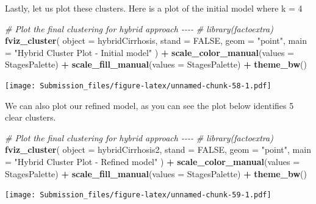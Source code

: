\documentclass[
]{article}
\newenvironment{Shaded}{\begin{snugshade}}{\end{snugshade}}
\newcommand{\AttributeTok}[1]{\textcolor[rgb]{0.13,0.29,0.53}{#1}}
\newcommand{\CommentTok}[1]{\textcolor[rgb]{0.56,0.35,0.01}{\textit{#1}}}
\newcommand{\ConstantTok}[1]{\textcolor[rgb]{0.56,0.35,0.01}{#1}}
\newcommand{\FunctionTok}[1]{\textcolor[rgb]{0.13,0.29,0.53}{\textbf{#1}}}
\newcommand{\NormalTok}[1]{#1}
\newcommand{\SpecialCharTok}[1]{\textcolor[rgb]{0.81,0.36,0.00}{\textbf{#1}}}
\newcommand{\StringTok}[1]{\textcolor[rgb]{0.31,0.60,0.02}{#1}}
\begin{document}
Lastly, let us plot these clusters. Here is a plot of the initial model
where k = 4

\begin{Shaded}
\begin{Highlighting}[]
\CommentTok{\# Plot the final clustering for hybrid approach {-}{-}{-}{-}}
\CommentTok{\# library(factoextra)}
\FunctionTok{fviz\_cluster}\NormalTok{(}
  \AttributeTok{object =}\NormalTok{ hybridCirrhosis,}
  \AttributeTok{stand =} \ConstantTok{FALSE}\NormalTok{,}
  \AttributeTok{geom =} \StringTok{"point"}\NormalTok{,}
  \AttributeTok{main =} \StringTok{"Hybrid Cluster Plot {-} Initial model"}
\NormalTok{) }\SpecialCharTok{+}
  \FunctionTok{scale\_color\_manual}\NormalTok{(}\AttributeTok{values =}\NormalTok{ StagesPalette) }\SpecialCharTok{+}
  \FunctionTok{scale\_fill\_manual}\NormalTok{(}\AttributeTok{values =}\NormalTok{ StagesPalette) }\SpecialCharTok{+}
  \FunctionTok{theme\_bw}\NormalTok{() }
\end{Highlighting}
\end{Shaded}

\texttt{[image: Submission\_files/figure-latex/unnamed-chunk-58-1.pdf]}

We can also plot our refined model, as you can see the plot below
identifies 5 clear clusters.

\begin{Shaded}
\begin{Highlighting}[]
\CommentTok{\# Plot the final clustering for hybrid approach {-}{-}{-}{-}}
\CommentTok{\# library(factoextra)}
\FunctionTok{fviz\_cluster}\NormalTok{(}
  \AttributeTok{object =}\NormalTok{ hybridCirrhosis2,}
  \AttributeTok{stand =} \ConstantTok{FALSE}\NormalTok{,}
  \AttributeTok{geom =} \StringTok{"point"}\NormalTok{,}
  \AttributeTok{main =} \StringTok{"Hybrid Cluster Plot {-} Refined model"}
\NormalTok{) }\SpecialCharTok{+}
  \FunctionTok{scale\_color\_manual}\NormalTok{(}\AttributeTok{values =}\NormalTok{ StagesPalette) }\SpecialCharTok{+}
  \FunctionTok{scale\_fill\_manual}\NormalTok{(}\AttributeTok{values =}\NormalTok{ StagesPalette) }\SpecialCharTok{+}
  \FunctionTok{theme\_bw}\NormalTok{() }
\end{Highlighting}
\end{Shaded}

\texttt{[image: Submission\_files/figure-latex/unnamed-chunk-59-1.pdf]}
\end{document}
